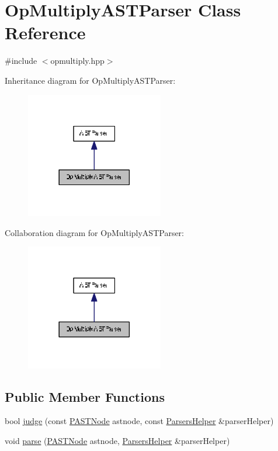 \hypertarget{class_op_multiply_a_s_t_parser}{}\section{Op\+Multiply\+A\+S\+T\+Parser Class Reference}
\label{class_op_multiply_a_s_t_parser}


{\ttfamily \#include $<$opmultiply.\+hpp$>$}



Inheritance diagram for Op\+Multiply\+A\+S\+T\+Parser\+:
\nopagebreak
\begin{figure}[H]
\begin{center}
\leavevmode
\includegraphics[width=170pt]{class_op_multiply_a_s_t_parser__inherit__graph}
\end{center}
\end{figure}


Collaboration diagram for Op\+Multiply\+A\+S\+T\+Parser\+:
\nopagebreak
\begin{figure}[H]
\begin{center}
\leavevmode
\includegraphics[width=170pt]{class_op_multiply_a_s_t_parser__coll__graph}
\end{center}
\end{figure}
\subsection*{Public Member Functions}
\begin{DoxyCompactItemize}
\item 
bool \hyperlink{class_op_multiply_a_s_t_parser_ab46f82cbdebb6fdd05af7b8f81e41ab3}{judge} (const \hyperlink{ast_8hpp_ab65291a3ef1ea9ec8e3d396783b77e46}{P\+A\+S\+T\+Node} astnode, const \hyperlink{class_parsers_helper}{Parsers\+Helper} \&parser\+Helper)
\item 
void \hyperlink{class_op_multiply_a_s_t_parser_a91903f8ea235e1bfd7e7c668347a4707}{parse} (\hyperlink{ast_8hpp_ab65291a3ef1ea9ec8e3d396783b77e46}{P\+A\+S\+T\+Node} astnode, \hyperlink{class_parsers_helper}{Parsers\+Helper} \&parser\+Helper)
\end{DoxyCompactItemize}


